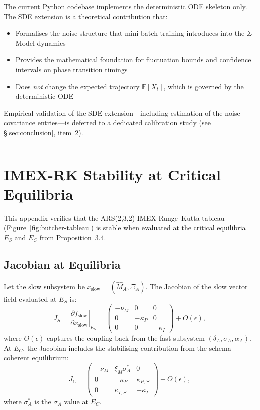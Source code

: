 \documentclass[10pt]{article}
\begin{document}
The current Python codebase implements the deterministic ODE skeleton
only. The SDE extension is a theoretical contribution that:
\begin{itemize}[nosep]
\item Formalises the noise structure that mini-batch training
  introduces into the $\Sigma$-Model dynamics
\item Provides the mathematical foundation for fluctuation bounds
  and confidence intervals on phase transition timings
\item Does \emph{not} change the expected trajectory $\mathbb{E}[X_t]$,
  which is governed by the deterministic ODE
\end{itemize}
Empirical validation of the SDE extension---including estimation of the
noise covariance entries---is deferred to a dedicated calibration study
(see \S\ref{sec:conclusion}, item~2).

\noindent\rule{\linewidth}{0.4pt}

\clearpage
\section{IMEX-RK Stability at Critical Equilibria}\label{app:stability}

This appendix verifies that the ARS(2,3,2) IMEX Runge--Kutta tableau
(Figure~\ref{fig:butcher-tableau}) is stable when evaluated at the
critical equilibria $E_S$ and $E_C$ from Proposition~3.4.

\subsection{Jacobian at Equilibria}

Let the slow subsystem be $x_{\text{slow}} = (\hat{M}_A, \Xi_A)$.
The Jacobian of the slow vector field evaluated at $E_S$ is:
\begin{equation}
J_S = \left.\frac{\partial f_{\text{slow}}}{\partial x_{\text{slow}}}\right|_{E_S}
= \begin{pmatrix}
-\nu_M & 0 & 0 \\
0 & -\kappa_P & 0 \\
0 & 0 & -\kappa_I
\end{pmatrix} + O(\epsilon),
\end{equation}
where $O(\epsilon)$ captures the coupling back from the fast subsystem
$(\delta_A, \sigma_A, \alpha_A)$. At $E_C$, the Jacobian includes
the stabilising contribution from the schema-coherent equilibrium:
\begin{equation}
J_C = \begin{pmatrix}
-\nu_M & \xi_M \sigma_A^* & 0 \\
0 & -\kappa_P & \kappa_{P,\Xi} \\
0 & \kappa_{I,\Xi} & -\kappa_I
\end{pmatrix} + O(\epsilon),
\end{equation}
where $\sigma_A^*$ is the $\sigma_A$ value at $E_C$.
\end{document}
